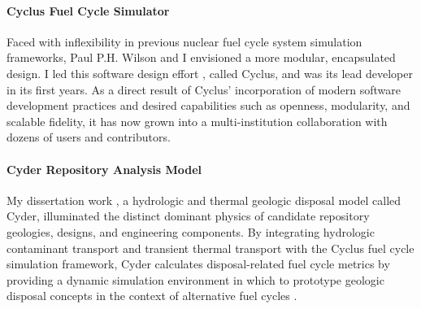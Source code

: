 \documentclass[a4paper, 10pt]{article}
\begin{document}


\paragraph{Cyclus Fuel Cycle Simulator} Faced with inflexibility in previous 
nuclear fuel cycle system simulation frameworks, Paul P.H. Wilson and I 
envisioned a more modular, encapsulated design. I led this software design effort 
\cite{huff_open_2011, huff_cyclus_2011}, called Cyclus, and was its lead 
developer in its first years.  As a direct result of 
Cyclus' incorporation of modern software development practices and desired 
capabilities such as openness, modularity, and scalable fidelity, it has now 
grown into a multi-institution collaboration with dozens of users and 
contributors. 

\paragraph{Cyder Repository Analysis Model}


My dissertation work \cite{huff_integrated_2013}, a hydrologic and thermal 
geologic disposal model called Cyder, illuminated the distinct dominant physics 
of candidate repository geologies, designs, and engineering components. By 
integrating hydrologic contaminant transport \cite{huff_sensitivity_2012} and 
transient thermal transport \cite{huff_numerical_2012} with the Cyclus fuel 
cycle simulation framework, Cyder calculates disposal-related fuel cycle metrics 
by providing a dynamic simulation environment in which to prototype geologic 
disposal concepts in the context of alternative fuel cycles 
\cite{huff_cyclus_2013}.  
\end{document}
